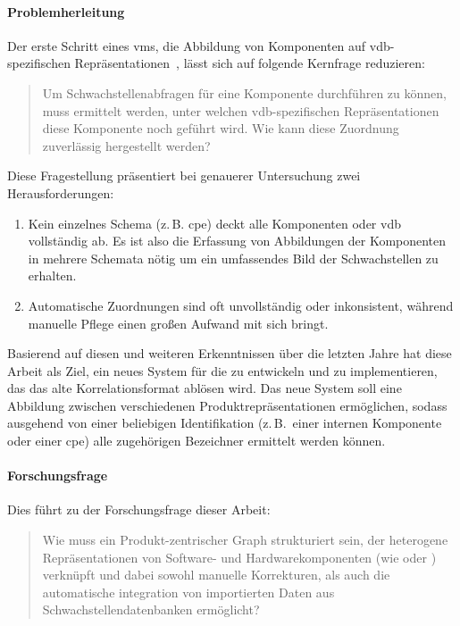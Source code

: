 \paragraph{Problemherleitung}

Der erste Schritt eines \acrshort{vms}, die Abbildung von Komponenten auf \acrshort{vdb}-spezifischen Repräsentationen\ \autocite{Idrissi_Sebai_Faroukhi_Mahouachi_2024}, lässt sich auf folgende Kernfrage reduzieren:

\begin{quote}
    Um Schwachstellenabfragen für eine Komponente durchführen zu können, muss ermittelt werden, unter welchen \acrshort{vdb}-spezifischen Repräsentationen diese Komponente noch geführt wird.
    Wie kann diese Zuordnung zuverlässig hergestellt werden?
\end{quote}

Diese Fragestellung präsentiert bei genauerer Untersuchung zwei Herausforderungen:

\begin{enumerate}
    \item Kein einzelnes Schema (z.\,B. \acrshort{cpe}) deckt alle Komponenten oder \acrshort{vdb} vollständig ab.
    Es ist also die Erfassung von Abbildungen der Komponenten in mehrere Schemata nötig um ein umfassendes Bild der Schwachstellen zu erhalten.
    \item Automatische Zuordnungen sind oft unvollständig oder inkonsistent, während manuelle Pflege einen großen Aufwand mit sich bringt.
\end{enumerate}

Basierend auf diesen und weiteren Erkenntnissen über die letzten Jahre hat diese Arbeit als Ziel, ein neues System für die \metaeffektsp zu entwickeln und zu implementieren, das das alte Korrelationsformat ablösen wird.
Das neue System soll eine Abbildung zwischen verschiedenen Produktrepräsentationen ermöglichen, sodass ausgehend von einer beliebigen Identifikation (z.\,B.\ einer internen Komponente oder einer \acrshort{cpe}) alle zugehörigen Bezeichner ermittelt werden können.

\paragraph{Forschungsfrage}

Dies führt zu der Forschungsfrage dieser Arbeit:

\begin{quote}
    Wie muss ein Produkt-zentrischer Graph strukturiert sein, der heterogene Repräsentationen von Software- und Hardwarekomponenten (wie  oder ) verknüpft und
    dabei sowohl manuelle Korrekturen, als auch die automatische integration von importierten Daten aus Schwachstellendatenbanken ermöglicht?
\end{quote}


